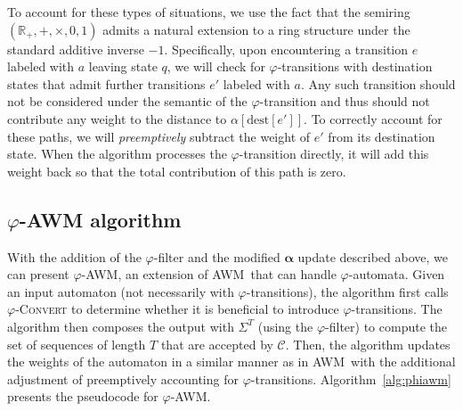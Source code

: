 \documentclass{article}
\newcommand{\sC}{\mathscr C}
\newcommand{\Rset}{\mathbb{R}}
\newcommand{\balpha}{{\boldsymbol \alpha}}
\renewcommand{\phi}{\varphi}
\newcommand{\dest}{\mathrm{dest}}
\newcommand{\AWM}{\textsc{AWM}}
\begin{document}
To account for these types of situations, we use the fact that the
semiring $(\Rset_+, +, \times, 0, 1)$ admits a natural extension to a
ring structure under the standard additive inverse $-1$. Specifically,
upon encountering a transition $e$ labeled with $a$ leaving state $q$,
we will check for $\phi$-transitions with destination states that
admit further transitions $e'$ labeled with $a$.  Any such transition
should not be considered under the semantic of the $\phi$-transition
and thus should not contribute any weight to the distance to
$\alpha[\dest[e']]$.  To correctly account for these paths, we will
\emph{preemptively} subtract the weight of $e'$ from its destination
state. When the algorithm processes the $\phi$-transition directly, it
will add this weight back so that the total contribution of this path
is zero.

\subsection{\textsc{$\phi$-AWM} algorithm}

With the addition of the $\phi$-filter and the modified $\balpha$ update described
above, we can present \textsc{$\phi$-AWM}, an extension of \AWM\ that can handle
$\phi$-automata. Given an input automaton (not necessarily with
$\phi$-transitions), the algorithm first calls \textsc{$\phi$-Convert}
to determine whether it is beneficial to introduce
$\phi$-transitions. The algorithm then composes the output with
$\Sigma^T$ (using the $\phi$-filter) to compute the set of sequences of
length $T$ that are accepted by $\sC$. Then, the algorithm updates the
weights of the automaton in a similar manner as in \AWM\, with the
additional adjustment of preemptively accounting for
$\phi$-transitions.  Algorithm~\ref{alg:phiawm} presents the
pseudocode for \textsc{$\phi$-AWM}.
\end{document}
